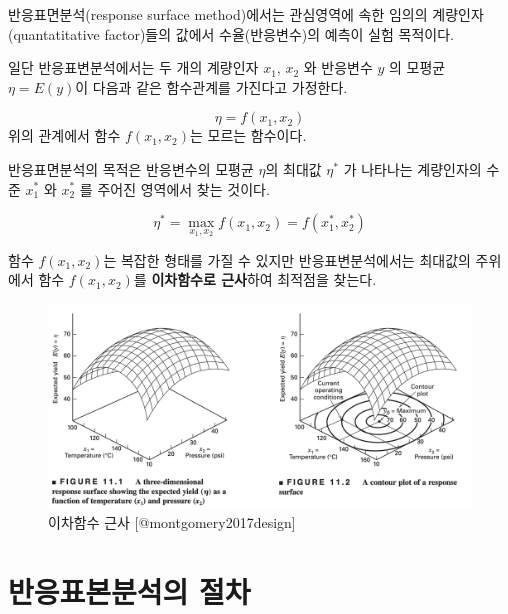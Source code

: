 \documentclass[
]{book}
\theoremstyle{definition}
\theoremstyle{definition}
\theoremstyle{definition}
\theoremstyle{definition}
\theoremstyle{remark}
\begin{document}
반응표면분석(response surface method)에서는 관심영역에 속한 임의의 계량인자(quantatitative factor)들의 값에서 수율(반응변수)의 예측이 실험 목적이다.

일단 반응표변분석에서는 두 개의 계량인자 \(x_1\), \(x_2\) 와 반응변수 \(y\) 의 모평균 \(\eta =E(y)\)이 다음과 같은 함수관계를 가진다고 가정한다.

\[ \eta = f(x_1, x_2) \]
위의 관계에서 함수 \(f(x_1, x_2)\)는 모르는 함수이다.

반응표면분석의 목적은 반응변수의 모평균 \(\eta\)의 최대값 \(\eta^*\) 가 나타나는 계량인자의 수준 \(x_1^*\) 와 \(x_2^*\) 를
주어진 영역에서 찾는 것이다.

\[   \eta^* = \max_{x_1, x_2} f(x_1, x_2) =f(x_1^*, x_2^*) \]

함수 \(f(x_1, x_2)\)는 복잡한 형태를 가질 수 있지만 반응표변분석에서는 최대값의 주위에서 함수 \(f(x_1, x_2)\)를 \textbf{이차함수로 근사}하여 최적점을 찾는다.

\begin{figure}

{\centering \includegraphics[width=1\linewidth]{myimages/response-01} 

}

\caption{이차함수 근사 [@montgomery2017design]}\label{fig:plot1}
\end{figure}

\hypertarget{uxbc18uxc751uxd45cuxbcf8uxbd84uxc11duxc758-uxc808uxcc28}{%
\section{반응표본분석의 절차}\label{uxbc18uxc751uxd45cuxbcf8uxbd84uxc11duxc758-uxc808uxcc28}}
\end{document}
